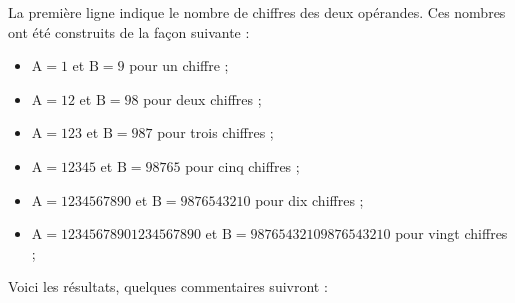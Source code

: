 \documentclass[12pt]{report}
\begin{document}
La première ligne indique le nombre de chiffres des deux
opérandes. Ces nombres ont été construits de la façon suivante :
\begin{itemize}
\item $\mathrm{A} = 1$ et $\mathrm{B} = 9$ pour un chiffre ;
\item $\mathrm{A} = 12$ et $\mathrm{B} = 98$ pour deux chiffres ;
\item $\mathrm{A} = 123$ et $\mathrm{B} = 987$ pour trois chiffres ;
\item $\mathrm{A} = 12345$ et $\mathrm{B} = 98765$ pour cinq chiffres ;
\item $\mathrm{A} = 1234567890$ et $\mathrm{B} = 9876543210$ pour dix
  chiffres ;
\item $\mathrm{A} = 12345678901234567890$ et $\mathrm{B} =
  98765432109876543210$ pour vingt chiffres ;
\end{itemize}
Voici les résultats, quelques commentaires suivront :
\end{document}
